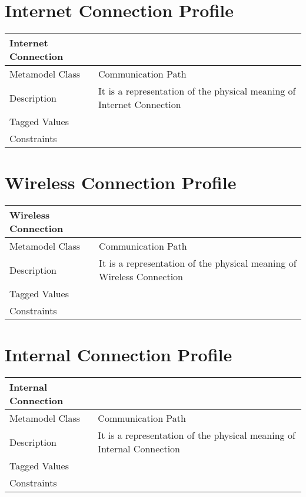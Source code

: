 \section{Internet Connection Profile}

\begin{longtable}{|p{4cm}|p{9cm}|}

\hline
\textbf{Internet Connection} & \\


\hline
Metamodel Class & Communication Path\\

\hline
Description & It is a representation of the physical meaning of Internet Connection\\

\hline
Tagged Values & \\

\hline
Constraints &\\

\hline
\end{longtable}

\section{Wireless Connection Profile}

\begin{longtable}{|p{4cm}|p{9cm}|}

\hline
\textbf{Wireless Connection} & \\


\hline
Metamodel Class & Communication Path\\

\hline
Description & It is a representation of the physical meaning of Wireless Connection\\

\hline
Tagged Values & \\

\hline
Constraints &\\

\hline
\end{longtable}

\section{Internal Connection Profile}

\begin{longtable}{|p{4cm}|p{9cm}|}

\hline
\textbf{Internal Connection} & \\


\hline
Metamodel Class & Communication Path\\

\hline
Description & It is a representation of the physical meaning of Internal Connection\\

\hline
Tagged Values & \\

\hline
Constraints &\\

\hline
\end{longtable}

